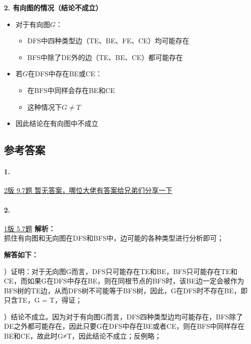 \documentclass{article}
\begin{document}
\noindent\textbf{2. 有向图的情况（结论不成立）}
\begin{itemize}
    \item 对于有向图$G$：
    \begin{itemize}
        \item DFS中四种类型边（TE、BE、FE、CE）均可能存在
        \item BFS中除了DE外的边（TE、BE、CE）都可能存在
    \end{itemize}
    
    \item 若$G$在DFS中存在BE或CE：
    \begin{itemize}
        \item 在BFS中同样会存在BE和CE
        \item 这种情况下$G \neq T$
    \end{itemize}
    
    \item 因此结论在有向图中不成立
\end{itemize}

\pagebreak

\subsection{参考答案}

\paragraph{1.}
\href{https://github.com/Shannju/njucser_helphelp/blob/main/Algorithm%E7%AE%97%E6%B3%95/%E7%AD%94%E6%A1%88/P4~7.pdf}{2版 9.7题 暂无答案，哪位大佬有答案给兄弟们分享一下}

\paragraph{2.}
\href{https://github.com/Shannju/njucser_helphelp/blob/main/Algorithm%E7%AE%97%E6%B3%95/%E7%AD%94%E6%A1%88/%E7%AE%97%E6%B3%95%E7%AD%94%E6%A1%88csdn%EF%BC%88%E5%8A%A9%E6%95%99%E5%B7%B2%E5%88%A0%E9%99%A4.pdf}{1版 5.7题}
\noindent\textbf{解析：\\}抓住有向图和无向图在DFS和BFS中，边可能的各种类型进行分析即可；

\noindent\textbf{解答如下：}

）证明：对于无向图G而言，DFS只可能存在TE和BE，BFS只可能存在TE和CE，而如果G在DFS中存在BE，则在同根节点的BFS时，该BE边一定会被作为BFS树的TE边，从而DFS树不可能等于BFS树，因此，G在DFS时不存在BE，即只含TE，G = T，得证；

）结论不成立。因为对于有向图G而言，DFS四种类型边均可能存在，BFS除了DE之外都可能存在，因此只要G在DFS中存在BE或者CE，则在BFS中同样存在BE和CE，故此时G≠T，因此结论不成立；反例略；
\end{document}
